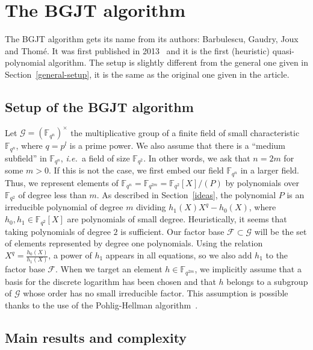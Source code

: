 \documentclass[a4paper,11pt]{article}
\theoremstyle{break}
\theoremstyle{sc}
\theoremstyle{definition}
\theoremstyle{remark}
\newcommand{\ie}{\emph{i.e.\ }}
\begin{document}
\section{The BGJT algorithm}
\label{bgjt}

The BGJT algorithm gets its name from its authors: Barbulescu, Gaudry, Joux and
Thomé. It was first published in 2013~\cite{BGJT13} and it is the first
(heuristic) quasi-polynomial algorithm. The setup is slightly different from the
general one given in Section~\ref{general-setup}, it is the same as the original
one given in the article.

\subsection{Setup of the BGJT algorithm}
\label{subsec:bgjt-setup}

Let $\mathcal G = (\mathbb{F}_{q^n})^\times$ the multiplicative group of a finite
field of small characteristic $\mathbb{F}_{q^n}$, where $q=p^l$ is a prime
power. We also assume that there is a ``medium subfield'' in
$\mathbb{F}_{q^n}$, \ie a field of size $\mathbb{F}_{q^2}$. In other words, we
ask that $n = 2m$ for some $m>0$. If this is not the case, we first embed our
field $\mathbb{F}_{q^n}$ in a larger field. Thus, we represent elements of
$\mathbb{F}_{q^n} = \mathbb{F}_{q^{2m}} = \mathbb{F}_{q^2}[X]/(P)$ by
polynomials over $\mathbb{F}_{q^2}$ of degree less than
$m$. As described in Section~\ref{ideas}, the polynomial $P$ is an irreducible
polynomial of degree $m$ dividing $h_1(X)X^q-h_0(X)$, where $h_0,
h_1\in\mathbb{F}_{q^2}[X]$ are polynomials of small degree. Heuristically, it
seems that taking polynomials of degree $2$ is sufficient. Our factor base
$\mathcal F\subset\mathcal G$ will be the set of elements represented by degree
one polynomials. Using the relation $X^q=\frac{h_0(X)}{h_1(X)}$, a power of
$h_1$ appears in all equations, so we also add $h_1$ to the factor base
$\mathcal F$. When we target an element $h\in\mathbb{F}_{q^{2m}}$, we implicitly
assume that a basis for the discrete logarithm has been chosen and that $h$
belongs to a subgroup of $\mathcal G$ whose order has no small irreducible
factor. This assumption is possible thanks to the use of the Pohlig-Hellman
algorithm~\cite{PH78}.

\subsection{Main results and complexity}
\end{document}
